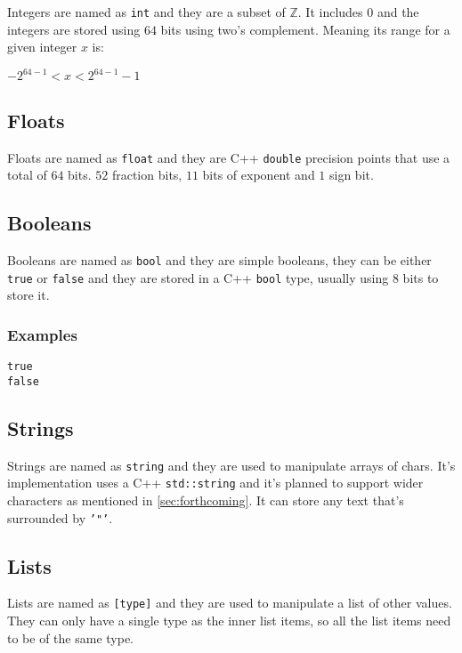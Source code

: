 Integers are named as \texttt{int} and they are a subset of $\mathbb{Z}$. It includes 0
and the integers are stored using $64$ bits using two's complement. Meaning its range for a given integer $x$ is:

\begin{center}
$-2^{64 - 1} < x < 2^{64 - 1} - 1$
\end{center}

\subsection{Floats}

Floats are named as \texttt{float} and they are C++ \texttt{double} precision points that use a total of $64$ bits. $52$ fraction bits, $11$ bits
of exponent and $1$ sign bit.

\subsection{Booleans}

Booleans are named as \texttt{bool} and they are simple booleans, they can be either \texttt{true} or \texttt{false} and they are stored in
a C++ \texttt{bool} type, usually using 8 bits to store it.

\subsubsection{Examples}

\begin{lstlisting}
true
false
\end{lstlisting}

\subsection{Strings}

Strings are named as \texttt{string} and they are used to manipulate arrays of chars. It's implementation uses
a C++ \texttt{std::string} and it's planned to support wider characters as mentioned in \autoref{sec:forthcoming}. It can store any text that's surrounded by \texttt{'"'}.

\subsection{Lists}

Lists are named as \texttt{[type]} and they are used to manipulate a list of other values. They can only have a single
type as the inner list items, so all the list items need to be of the same type.

